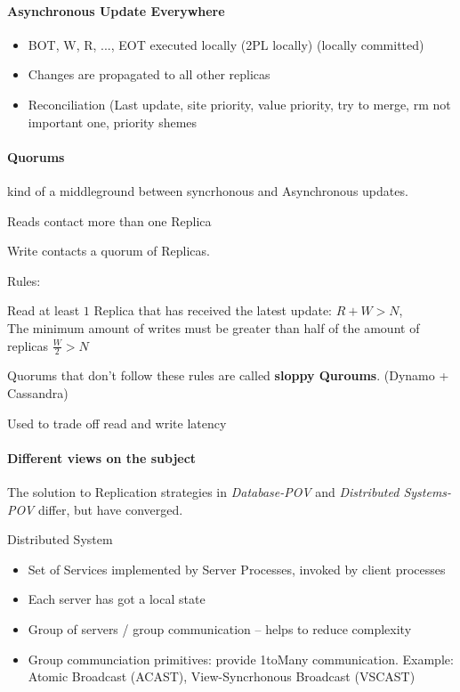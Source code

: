 \documentclass[a4paper,12pt]{article}%
\begin{document}
 
 
 \paragraph{Asynchronous Update Everywhere}
 \begin{itemize}
  \item BOT, W, R, ..., EOT executed locally (2PL locally) (locally committed) 
  \item Changes are propagated to all other replicas
  \item Reconciliation (Last update, site priority, value priority, try to merge, rm not important one, priority shemes
 \end{itemize}

 
 
 
 
 
 
 
 
 
 
 
 
 \fi
 
 
 
 
 \paragraph{Quorums}
 kind of a middleground between syncrhonous and Asynchronous updates.
 
 Reads contact more than one Replica
 
 Write contacts a quorum of Replicas.
 
 Rules:
 
 Read at least $1$ Replica that has received the latest update: $R+W > N$,\\
 The minimum amount of writes must be greater than half of the amount of replicas $\frac{W}{2} > N$
 
 Quorums that don't follow these rules are called {\bf sloppy Quroums}. (Dynamo + Cassandra)
 
 Used to trade off read and write latency
 
 
 
 
 \paragraph{Different views on the subject}
 The solution to Replication strategies in {\it Database-POV} and {\it Distributed Systems-POV} differ, but have converged.
 
 
 Distributed System
 \begin{itemize}
  \item Set of Services implemented by Server Processes, invoked by client processes
  \item Each server has got a local state
  \item Group of servers / group communication -- helps to reduce complexity
  \item Group communciation primitives: provide 1toMany communication. Example:  Atomic Broadcast (ACAST), View-Syncrhonous Broadcast (VSCAST) 
 \end{itemize}
\end{document}
